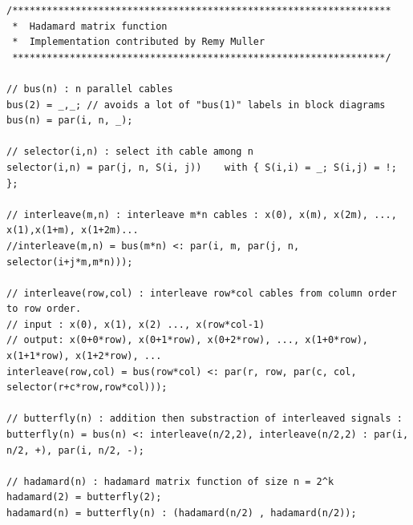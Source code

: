 \documentclass{article}
\begin{document}
\begin{lstlisting}[caption=\texttt{math.lib}]
/******************************************************************
 *  Hadamard matrix function
 *  Implementation contributed by Remy Muller
 *****************************************************************/

// bus(n) : n parallel cables
bus(2) = _,_; // avoids a lot of "bus(1)" labels in block diagrams
bus(n) = par(i, n, _);

// selector(i,n) : select ith cable among n
selector(i,n) = par(j, n, S(i, j))    with { S(i,i) = _; S(i,j) = !; };

// interleave(m,n) : interleave m*n cables : x(0), x(m), x(2m), ..., x(1),x(1+m), x(1+2m)...
//interleave(m,n) = bus(m*n) <: par(i, m, par(j, n, selector(i+j*m,m*n))); 

// interleave(row,col) : interleave row*col cables from column order to row order.
// input : x(0), x(1), x(2) ..., x(row*col-1)
// output: x(0+0*row), x(0+1*row), x(0+2*row), ..., x(1+0*row), x(1+1*row), x(1+2*row), ...
interleave(row,col) = bus(row*col) <: par(r, row, par(c, col, selector(r+c*row,row*col))); 

// butterfly(n) : addition then substraction of interleaved signals : 
butterfly(n) = bus(n) <: interleave(n/2,2), interleave(n/2,2) : par(i, n/2, +), par(i, n/2, -);

// hadamard(n) : hadamard matrix function of size n = 2^k
hadamard(2) = butterfly(2);
hadamard(n) = butterfly(n) : (hadamard(n/2) , hadamard(n/2));
\end{lstlisting}
\end{document}
